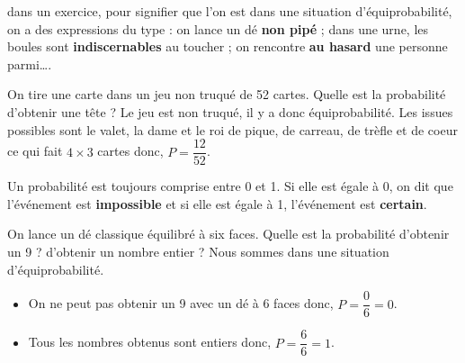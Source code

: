 \begin{remarque}
   dans un exercice, pour signifier que l'on est dans une situation d'équiprobabilité, on a des expressions du type : \og on lance un dé \textbf{non pipé} \fg ; \og dans une urne, les boules sont \textbf{indiscernables} au toucher \fg ; \og on rencontre \textbf{au hasard} une personne parmi\dots \fg.
\end{remarque}

\begin{exemple}
   On tire une carte dans un jeu non truqué de 52 cartes. Quelle est la probabilité d'obtenir une tête ?
   \correction
      Le jeu est non truqué, il y a donc équiprobabilité. Les issues possibles sont le valet, la dame et le roi de pique, de carreau, de trèfle et de coeur ce qui fait $4\times3$ cartes donc, $P =\dfrac{12}{52}$.
\end{exemple}

\begin{propriete}
   Un probabilité est toujours comprise entre 0 et 1. Si elle est égale à 0, on dit que l'événement est {\bf impossible} et si elle est égale à 1, l'événement est {\bf certain}.
\end{propriete}

\begin{exemple}
   On lance un dé classique équilibré à six faces. Quelle est la probabilité d'obtenir un 9 ? d'obtenir un nombre entier ?
\correction
   Nous sommes dans une situation d'équiprobabilité.
   \begin{itemize} 
      \item On ne peut pas obtenir un 9 avec un dé à 6 faces donc, $P =\dfrac06 =0$.
      \item Tous les nombres obtenus sont entiers donc, $P =\dfrac66 =1$.
   \end{itemize}
\end{exemple}


\exercicesbase

